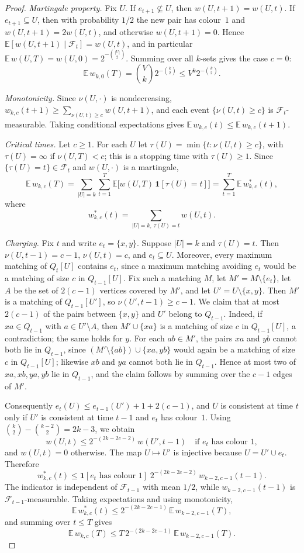 \begin{proof}
\emph{Martingale property.}  Fix $U$.  If $e_{t+1}\not\subseteq U$, then
$w(U,t+1)=w(U,t)$.  If $e_{t+1}\subseteq U$, then with probability $1/2$
the new pair has colour~$1$ and $w(U,t+1)=2w(U,t)$, and otherwise
$w(U,t+1)=0$.  Hence $\mathbb E[w(U,t+1)\mid\mathcal F_t]=w(U,t)$, and in
particular $\mathbb E\,w(U,T)=w(U,0)=2^{-\binom{|U|}2}$.  Summing over all
$k$-sets gives the case $c=0$:
\[
 \mathbb E\,w_{k,0}(T)=\binom Vk2^{-\binom k2}\le V^k2^{-\binom k2}.
\]

\emph{Monotonicity.}  Since $\nu(U,\cdot)$ is nondecreasing,
$w_{k,c}(t+1)\ge\sum_{\nu(U,t)\ge c}w(U,t+1)$, and each event
$\{\nu(U,t)\ge c\}$ is $\mathcal F_t$-measurable.  Taking conditional
expectations gives $\mathbb E\,w_{k,c}(t)\le\mathbb E\,w_{k,c}(t+1)$.

\emph{Critical times.}  Let $c\ge1$.  For each $U$ let
$\tau(U)=\min\{t:\nu(U,t)\ge c\}$, with $\tau(U)=\infty$ if
$\nu(U,T)<c$; this is a stopping time with $\tau(U)\ge1$.
Since $\{\tau(U)=t\}\in\mathcal F_t$ and $w(U,\cdot)$ is a martingale,
\[
 \mathbb E\,w_{k,c}(T)
 =\sum_{|U|=k}\sum_{t=1}^T\mathbb E\bigl[w(U,T)\,\mathbf 1[\tau(U)=t]\bigr]
 =\sum_{t=1}^T\mathbb E\,w^*_{k,c}(t),
\]
where
\[
 w^*_{k,c}(t)=\sum_{|U|=k,\ \tau(U)=t}w(U,t).
\]

\emph{Charging.}  Fix $t$ and write $e_t=\{x,y\}$.  Suppose $|U|=k$ and
$\tau(U)=t$.  Then $\nu(U,t-1)=c-1$, $\nu(U,t)=c$, and $e_t\subseteq U$.
Moreover, every maximum matching of $Q_t[U]$ contains $e_t$, since a
maximum matching avoiding $e_t$ would be a matching of size $c$ in
$Q_{t-1}[U]$.  Fix such a matching $M$, let $M'=M\setminus\{e_t\}$, let $A$
be the set of $2(c-1)$ vertices covered by $M'$, and let
$U'=U\setminus\{x,y\}$.  Then $M'$ is a matching of $Q_{t-1}[U']$, so
$\nu(U',t-1)\ge c-1$.  We claim that at most $2(c-1)$ of the pairs between
$\{x,y\}$ and $U'$ belong to $Q_{t-1}$.  Indeed, if $xa\in Q_{t-1}$ with
$a\in U'\setminus A$, then $M'\cup\{xa\}$ is a matching of size $c$ in
$Q_{t-1}[U]$, a contradiction; the same holds for $y$.  For each
$ab\in M'$, the pairs $xa$ and $yb$ cannot both lie in $Q_{t-1}$, since
$(M'\setminus\{ab\})\cup\{xa,yb\}$ would again be a matching of size $c$ in
$Q_{t-1}[U]$; likewise $xb$ and $ya$ cannot both lie in $Q_{t-1}$.  Hence
at most two of $xa,xb,ya,yb$ lie in $Q_{t-1}$, and the claim follows by
summing over the $c-1$ edges of $M'$.

Consequently $e_t(U)\le e_{t-1}(U')+1+2(c-1)$, and $U$ is consistent at
time $t$ only if $U'$ is consistent at time $t-1$ and $e_t$ has colour~$1$.
Using $\binom k2-\binom{k-2}2=2k-3$, we obtain
\[
 w(U,t)\le 2^{-(2k-2c-2)}\,w(U',t-1)
 \quad\text{if }e_t\text{ has colour }1,
\]
and $w(U,t)=0$ otherwise.  The map $U\mapsto U'$ is injective because
$U=U'\cup e_t$.  Therefore
\[
 w^*_{k,c}(t)\le
 \mathbf 1[e_t\text{ has colour }1]\;2^{-(2k-2c-2)}\,w_{k-2,c-1}(t-1).
\]
The indicator is independent of $\mathcal F_{t-1}$ with mean $1/2$, while
$w_{k-2,c-1}(t-1)$ is $\mathcal F_{t-1}$-measurable.  Taking expectations
and using monotonicity,
\[
 \mathbb E\,w^*_{k,c}(t)\le 2^{-(2k-2c-1)}\,\mathbb E\,w_{k-2,c-1}(T),
\]
and summing over $t\le T$ gives
\[
 \mathbb E\,w_{k,c}(T)\le T\,2^{-(2k-2c-1)}\,\mathbb E\,w_{k-2,c-1}(T).
\]


\end{proof}

